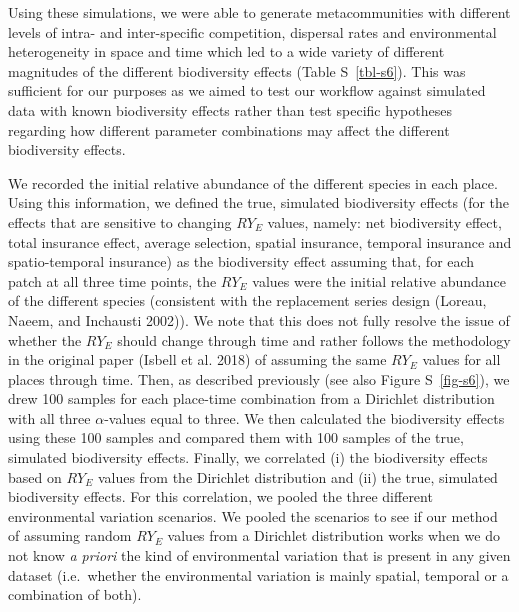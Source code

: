 \documentclass[
  letterpaper,
  DIV=11,
  numbers=noendperiod]{scrartcl}
\begin{document}
Using these simulations, we were able to generate metacommunities with
different levels of intra- and inter-specific competition, dispersal
rates and environmental heterogeneity in space and time which led to a
wide variety of different magnitudes of the different biodiversity
effects (Table S~\ref{tbl-s6}). This was sufficient for our purposes as
we aimed to test our workflow against simulated data with known
biodiversity effects rather than test specific hypotheses regarding how
different parameter combinations may affect the different biodiversity
effects.

We recorded the initial relative abundance of the different species in
each place. Using this information, we defined the true, simulated
biodiversity effects (for the effects that are sensitive to changing
\(RY_E\) values, namely: net biodiversity effect, total insurance
effect, average selection, spatial insurance, temporal insurance and
spatio-temporal insurance) as the biodiversity effect assuming that, for
each patch at all three time points, the \(RY_E\) values were the
initial relative abundance of the different species (consistent with the
replacement series design (Loreau, Naeem, and Inchausti 2002)). We note
that this does not fully resolve the issue of whether the \(RY_E\)
should change through time and rather follows the methodology in the
original paper (Isbell et al. 2018) of assuming the same \(RY_E\) values
for all places through time. Then, as described previously (see also
Figure S~\ref{fig-s6}), we drew 100 samples for each place-time
combination from a Dirichlet distribution with all three
\(\alpha\)-values equal to three. We then calculated the biodiversity
effects using these 100 samples and compared them with 100 samples of
the true, simulated biodiversity effects. Finally, we correlated (i) the
biodiversity effects based on \(RY_E\) values from the Dirichlet
distribution and (ii) the true, simulated biodiversity effects. For this
correlation, we pooled the three different environmental variation
scenarios. We pooled the scenarios to see if our method of assuming
random \(RY_E\) values from a Dirichlet distribution works when we do
not know \emph{a priori} the kind of environmental variation that is
present in any given dataset (i.e.~whether the environmental variation
is mainly spatial, temporal or a combination of both).
\end{document}
